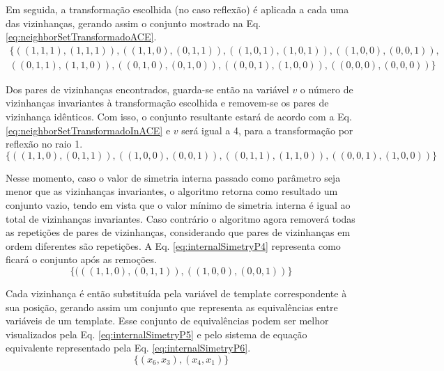 Em seguida, a transformação escolhida (no caso reflexão) é aplicada a cada uma das vizinhanças, gerando assim o conjunto mostrado na Eq. \eqref{eq:neighborSetTransformadoACE}.  
\begin{equation}
\begin{split}
\{
((1,1,1),(1,1,1)),
((1,1,0),(0,1,1)),
((1,0,1),(1,0,1)),
((1,0,0),(0,0,1)),\\
((0,1,1),(1,1,0)),
((0,1,0),(0,1,0)),
((0,0,1),(1,0,0)),
((0,0,0),(0,0,0))\}
\label{eq:neighborSetTransformadoACE}
\end{split}
\end{equation}

Dos pares de vizinhanças encontrados, guarda-se então na variável $v$ o número de vizinhanças invariantes à transformação escolhida e removem-se os pares de vizinhança idênticos. Com isso, o conjunto resultante estará de acordo com a Eq. \eqref{eq:neighborSetTransformadoInACE} e $v$ será igual a 4, para a transformação por reflexão no raio 1.
\begin{equation}
\{((1,1,0),(0,1,1)),
((1,0,0),(0,0,1)),
((0,1,1),(1,1,0)),
((0,0,1),(1,0,0))\}
\label{eq:neighborSetTransformadoInACE}
\end{equation}

Nesse momento, caso o valor de simetria interna passado como parâmetro seja menor que as vizinhanças invariantes, o algoritmo retorna como resultado um conjunto vazio, tendo em vista que o valor mínimo de simetria interna é igual ao total de vizinhanças invariantes. Caso contrário o algoritmo agora removerá todas as repetições de pares de vizinhanças, considerando que pares de vizinhanças em ordem diferentes são repetições. A Eq. \eqref{eq:internalSimetryP4} representa como ficará o conjunto após as remoções.
\begin{equation}
\{(((1,1,0),(0,1,1)), ((1,0,0),(0,0,1))\}
\label{eq:internalSimetryP4}
\end{equation}

Cada vizinhança é então substituída pela variável de template correspondente à sua posição, gerando assim um conjunto que representa as equivalências entre variáveis de um template. Esse conjunto de equivalências podem ser melhor visualizados pela Eq. \eqref{eq:internalSimetryP5} e pelo sistema de equação equivalente representado pela Eq. \eqref{eq:internalSimetryP6}.
\begin{equation}
\{(x_6,x_3), (x_4,x_1)\}
\label{eq:internalSimetryP5}
\end{equation}


